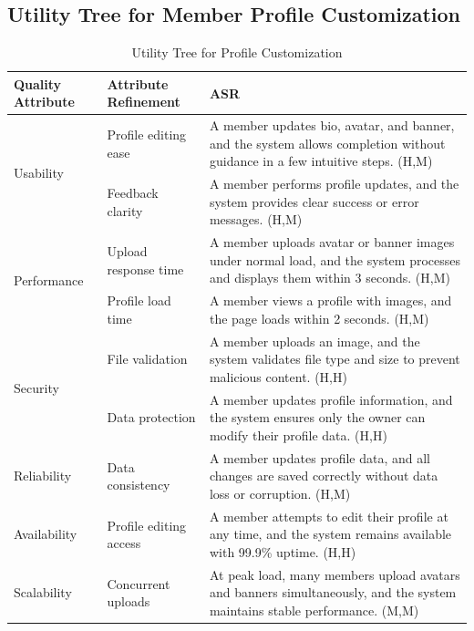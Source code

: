 \documentclass{article}
\begin{document}
\subsection{Utility Tree for Member Profile Customization}

\begin{table}[H]
\centering
\caption{Utility Tree for Profile Customization}
\begin{tabular}{|p{3cm}|p{4cm}|p{7cm}|}
\hline
\textbf{Quality Attribute} & \textbf{Attribute Refinement} & \textbf{ASR} \\
\hline

\multirow{2}{*}{Usability}
& Profile editing ease
& A member updates bio, avatar, and banner, and the system allows completion without guidance in a few intuitive steps. (H,M) \\
\cline{2-3}
& Feedback clarity
& A member performs profile updates, and the system provides clear success or error messages. (H,M) \\
\hline

\multirow{2}{*}{Performance}
& Upload response time
& A member uploads avatar or banner images under normal load, and the system processes and displays them within 3 seconds. (H,M) \\
\cline{2-3}
& Profile load time
& A member views a profile with images, and the page loads within 2 seconds. (H,M) \\
\hline

\multirow{2}{*}{Security}
& File validation
& A member uploads an image, and the system validates file type and size to prevent malicious content. (H,H) \\
\cline{2-3}
& Data protection
& A member updates profile information, and the system ensures only the owner can modify their profile data. (H,H) \\
\hline

Reliability
& Data consistency
& A member updates profile data, and all changes are saved correctly without data loss or corruption. (H,M) \\
\hline

Availability
& Profile editing access
& A member attempts to edit their profile at any time, and the system remains available with 99.9\% uptime. (H,H) \\
\hline

Scalability
& Concurrent uploads
& At peak load, many members upload avatars and banners simultaneously, and the system maintains stable performance. (M,M) \\
\hline


\end{tabular}
\end{table}
\end{document}
